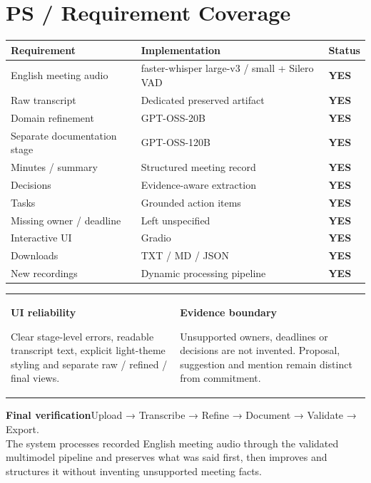 \documentclass[9pt,a4paper]{extarticle}
\renewcommand{\arraystretch}{0.94}
\begin{document}
\section*{PS / Requirement Coverage}
\scriptsize
\begin{center}
{\renewcommand{\arraystretch}{0.72}\begin{tabularx}{0.98\textwidth}{@{}l X l@{}}
\toprule
\textbf{Requirement} & \textbf{Implementation} & \textbf{Status}\\
\midrule
English meeting audio & faster-whisper large-v3 / small + Silero VAD & \textbf{YES}\\
Raw transcript & Dedicated preserved artifact & \textbf{YES}\\
Domain refinement & GPT-OSS-20B & \textbf{YES}\\
Separate documentation stage & GPT-OSS-120B & \textbf{YES}\\
Minutes / summary & Structured meeting record & \textbf{YES}\\
Decisions & Evidence-aware extraction & \textbf{YES}\\
Tasks & Grounded action items & \textbf{YES}\\
Missing owner / deadline & Left unspecified & \textbf{YES}\\
Interactive UI & Gradio & \textbf{YES}\\
Downloads & TXT / MD / JSON & \textbf{YES}\\
New recordings & Dynamic processing pipeline & \textbf{YES}\\
\bottomrule
\end{tabularx}}
\end{center}
\normalsize

\vspace{1.5pt}
\begin{tabularx}{\textwidth}{@{}XX@{}}
\begin{card}[top=3pt,bottom=3pt]\textbf{UI reliability}\par\small Clear stage-level errors, readable transcript text, explicit light-theme styling and separate raw / refined / final views.
\end{card}&
\begin{card}[top=3pt,bottom=3pt]\textbf{Evidence boundary}\par\small Unsupported owners, deadlines or decisions are not invented. Proposal, suggestion and mention remain distinct from commitment.
\end{card}
\end{tabularx}

\vspace{2pt}
\begin{darkcard}
\centering\small
\textbf{Final verification}\quad Upload → Transcribe → Refine → Document → Validate → Export.\\[-1pt]
The system processes recorded English meeting audio through the validated multimodel pipeline and preserves what was said first, then improves and structures it without inventing unsupported meeting facts.
\end{darkcard}
\end{document}
